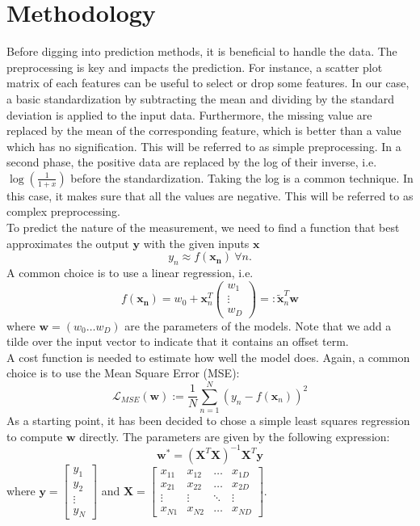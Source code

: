 \documentclass[10pt,conference,compsocconf]{IEEEtran}
\newcommand{\xx}{\mathbf{x}}
\newcommand{\yy}{\mathbf{y}}
\newcommand{\ww}{\mathbf{w}}
\newcommand{\XX}{\mathbf{X}}
\newcommand{\Lagr}{\mathcal{L}}
\newcommand{\Lmse}{\Lagr_{MSE}}
\begin{document}
\section{Methodology}
Before digging into prediction methods, it is beneficial to handle the data. The preprocessing is key and impacts the prediction. For instance, a scatter plot matrix of each features can be useful to select or drop some features. In our case, a basic standardization by subtracting the mean and dividing by the standard deviation is applied to the input data. Furthermore, the missing value are replaced by the mean of the corresponding feature, which is better than a value which has no signification. This will be referred to as simple preprocessing.  In a second phase, the positive data are replaced by the log of their inverse, i.e. $\log\left(\frac{1}{1+x}\right)$ before the standardization. Taking the log is a common technique. In this case, it makes sure that all the values are negative. This will be referred to as complex preprocessing.\\
To predict the nature of the measurement, we need to find a function that best approximates the output $\yy$ with the given inputs $\xx$
$$
y_n \approx f(\mathbf{x_n}) \ \forall n.
$$
A common choice is to use a linear regression, i.e.
$$
f(\mathbf{x_n}) = w_0 +  \xx_n^T\begin{pmatrix} w_1 \\ \vdots\\ w_D \end{pmatrix} =: \tilde{\xx}_n^T \ww
$$
where $\ww = (w_0 \ldots w_D)$ are the parameters of the models. Note that we add a tilde over the input vector to indicate that it contains an offset term.\\
A cost function is needed to estimate how well the model does. Again, a common choice is to use the Mean Square Error (MSE):
$$
\Lmse(\ww) := \frac 1N \sum_{n=1}^N \left( y_n -f(\xx_n) \right)^2
$$
As a starting point, it has been decided to chose a simple least squares regression  to compute $\ww$ directly. The parameters are given by the following expression:
$$
\ww^* = (\XX^T\XX)^{-1}\XX^T\yy
$$
where $\yy = \begin{bmatrix}y_1 \\ y_2 \\ \vdots \\y_N \end{bmatrix}$ and $\XX = \begin{bmatrix}x_{11} & x_{12} & \hdots & x_{1D} \\ x_{21} & x_{22} & \hdots & x_{2D} \\ \vdots & \vdots & \ddots & \vdots \\ x_{N1} & x_{N2} & \hdots & x_{ND} \end{bmatrix}$.
\end{document}
